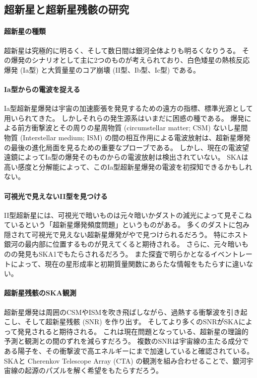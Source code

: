 \subsection{超新星と超新星残骸の研究}
\label{c09.s2.ss10}

\paragraph{超新星の種類}

超新星は究極的に明るく、そして数日間は銀河全体よりも明るくなりうる。
その爆発のシナリオとして主に2つのものが考えられており、白色矮星の熱核反応爆発 (Ia型) と大質量星のコア崩壊 (II型、Ib型、Ic型) である。

\paragraph{Ia型からの電波を捉える}

Ia型超新星爆発は宇宙の加速膨張を発見するための遠方の指標、標準光源として用いられてきた。
しかしそれらの発生源系はいまだに困惑の種である。
爆発による前方衝撃波とその周りの星周物質 (circumstellar matter; CSM) ないし星間物質 (Interstellar medium; ISM) の間の相互作用による電波放射は、超新星爆発の最後の進化局面を見るための重要なプローブである。
しかし、現在の電波望遠鏡によってIa型の爆発そのものからの電波放射は検出されていない。
SKAは高い感度と分解能によって、このIa型超新星爆発の電波を初探知できるかもしれない。

\paragraph{可視光で見えないII型を見つける}

II型超新星には、可視光で暗いものは元々暗いかダストの減光によって見そこねているという「超新星爆発頻度問題」というものがある。
多くのダストに包み隠されて可視光で見えない超新星爆発がやで見つけられるだろう。
特にホスト銀河の最内部に位置するものが見えてくると期待される。
さらに、元々暗いものの発見もSKA1でもたらされるだろう。
また探査で明らかとなるイベントレートによって、現在の星形成率と初期質量関数にあらたな情報をもたらすに違いない。

\paragraph{超新星残骸のSKA観測}

超新星爆発は周囲のCSMやISMを吹き飛ばしながら、過熱する衝撃波を引き起こし、そして超新星残骸 (SNR) を作り出す。
そしてより多くのSNRがSKAによって発見されると期待される。
これは現在問題となっている、超新星の理論的予測と観測との間のずれを減らすだろう。
複数のSNRは宇宙線の主たる成分である陽子を、その衝撃波で高エネルギーにまで加速していると確認されている。
SKAと Cherenkov Telescope Array (CTA) の観測を組み合わせることで、銀河宇宙線の起源のパズルを解く希望をもたらすだろう。


